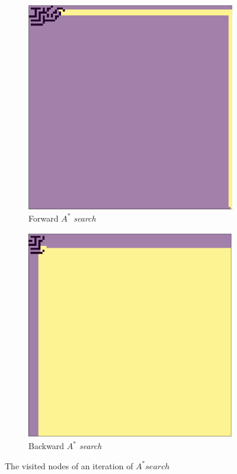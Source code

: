 \begin{figure}[H]
\begin{subfigure}{.5\textwidth}
  \centering
  \includegraphics[width=0.8\linewidth]{Report/Part3/Forward_Astar_iter21.png}  
  \caption{Forward \emph{$A^*$ search}}
\end{subfigure}
\begin{subfigure}{.5\textwidth}
  \centering
  \includegraphics[width=0.8\linewidth]{Report/Part3/Backward_Astar_iter21.png}  
  \caption{Backward \emph{$A^*$ search}}
\end{subfigure}
\caption{The visited nodes of an iteration of $A^* search$}
\end{figure}


